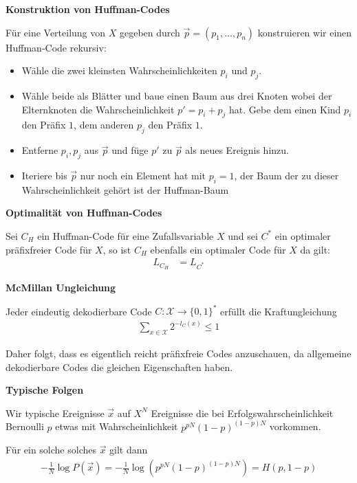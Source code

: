 \documentclass[25pt]{sciposter}
\newenvironment{defn}[1]{\begin{mdframed}[backgroundcolor=blue!10,innertopmargin=15pt, nobreak=true,innerbottommargin=15pt]
		\textbf{#1 }
	}
	{ 
	\end{mdframed}
}
\newenvironment{thm}[1]{\begin{mdframed}[nobreak=true,backgroundcolor=Emerald!10,innertopmargin=15pt, innerbottommargin=15pt]
		\textbf{#1 }
	}
	{ 
	\end{mdframed}
}
\begin{document}
\begin{multicols}{3}
\begin{defn}{Konstruktion von Huffman-Codes}
	Für eine Verteilung von $X$ gegeben durch $\vec{p} = (p_1,\ldots,p_n)$ konstruieren wir einen Huffman-Code rekursiv:
	\begin{itemize}
		\item Wähle die zwei kleinsten Wahrscheinlichkeiten $p_i$ und $p_j$.
		\item Wähle beide als Blätter und baue einen Baum aus drei Knoten wobei der Elternknoten die Wahrscheinlichkeit $p' = p_i + p_j$ hat. Gebe dem einen Kind $p_i$ den Präfix $1$, dem anderen $p_j$ den Präfix $1$.
		\item Entferne $p_i,p_j$ aus $\vec{p}$ und füge $p'$ zu $\vec{p}$ als neues Ereignis hinzu.
		\item Iteriere bis $\vec{p}$ nur noch ein Element hat mit $p_i = 1$, der Baum der zu dieser Wahrscheinlichkeit gehört ist der Huffman-Baum
	\end{itemize}
\end{defn}

\begin{thm}{Optimalität von Huffman-Codes}
Sei ${C_H}$ ein Huffman-Code für eine Zufallsvariable $X$ und sei $C^*$ ein optimaler präfixfreier Code für $X$, so ist $C_H$ ebenfalls ein optimaler Code für $X$ da gilt:
\begin{align*}
	L_{C_H} &= L_{C^*}
\end{align*}
\end{thm}

\begin{thm}{McMillan Ungleichung}
Jeder eindeutig dekodierbare Code $C:\mathcal{X}\to \{0,1\}^*$ erfüllt die Kraftungleichung
\begin{align*}
	\sum_{x\in\mathcal{X}} 2^{-l_C (x)} \leq 1
\end{align*}
\end{thm}

Daher folgt, dass es eigentlich reicht präfixfreie Codes anzuschauen, da allgemeine dekodierbare Codes die gleichen Eigenschaften haben.


\begin{defn}{Typische Folgen}
	Wir typische Ereignisse $\vec{x}$ auf $X^N$ Ereignisse die bei Erfolgswahrscheinlichkeit Bernoulli $p$ etwas mit Wahrscheinlichkeit $p^{pN} (1-p)^{(1-p)N}$ vorkommen.
	
	Für ein solche solches $\vec{x}$ gilt dann
	\begin{align*}
		-\frac{1}{N} \log P(\vec{x}) = - \frac{1}{N} \log \left( p^{pN} (1-p)^{(1-p)N}\right) = H(p,1-p)
	\end{align*} 
\end{defn}



\end{multicols}
\end{document}
